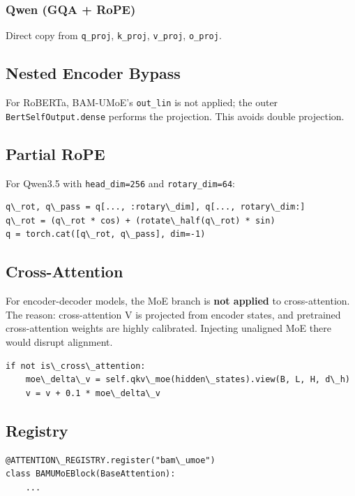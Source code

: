 \subsubsection{Qwen (GQA + RoPE)}
Direct copy from \texttt{q\_proj}, \texttt{k\_proj}, \texttt{v\_proj}, \texttt{o\_proj}.

\subsection{Nested Encoder Bypass}

For RoBERTa, BAM-UMoE's \texttt{out\_lin} is not applied; the outer 
\texttt{BertSelfOutput.dense} performs the projection. This avoids double projection.

\subsection{Partial RoPE}

For Qwen3.5 with \texttt{head\_dim=256} and \texttt{rotary\_dim=64}:
\begin{lstlisting}
q\_rot, q\_pass = q[..., :rotary\_dim], q[..., rotary\_dim:]
q\_rot = (q\_rot * cos) + (rotate\_half(q\_rot) * sin)
q = torch.cat([q\_rot, q\_pass], dim=-1)
\end{lstlisting}

\subsection{Cross-Attention}

For encoder-decoder models, the MoE branch is \textbf{not applied} to 
cross-attention. The reason: cross-attention V is projected from encoder 
states, and pretrained cross-attention weights are highly calibrated. 
Injecting unaligned MoE there would disrupt alignment.

\begin{lstlisting}
if not is\_cross\_attention:
    moe\_delta\_v = self.qkv\_moe(hidden\_states).view(B, L, H, d\_h)
    v = v + 0.1 * moe\_delta\_v
\end{lstlisting}

\subsection{Registry}

\begin{lstlisting}
@ATTENTION\_REGISTRY.register("bam\_umoe")
class BAMUMoEBlock(BaseAttention):
    ...
\end{lstlisting}

